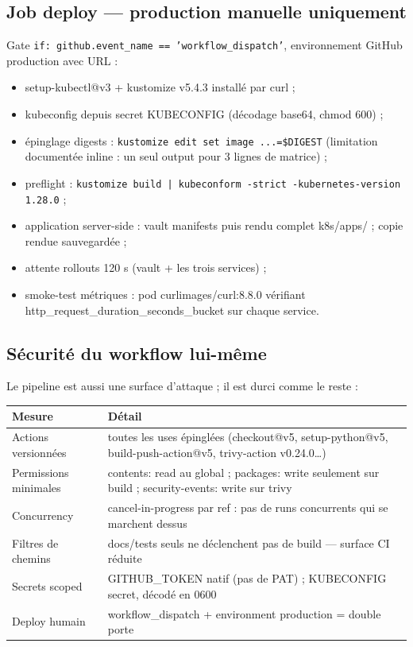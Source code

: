 \documentclass[12pt,a4paper]{article}
\begin{document}
\subsection{Job deploy --- production manuelle uniquement}
Gate \texttt{if: github.event\_name == 'workflow\_dispatch'}, environnement GitHub production avec URL :
\begin{itemize}[itemsep=1pt]
  \item setup-kubectl@v3 + kustomize v5.4.3 installé par curl ;
  \item kubeconfig depuis secret KUBECONFIG (décodage base64, chmod 600) ;
  \item épinglage digests : \texttt{kustomize edit set image ...=\$DIGEST} (limitation documentée inline : un seul output pour 3 lignes de matrice) ;
  \item preflight : \texttt{kustomize build | kubeconform -strict -kubernetes-version 1.28.0} ;
  \item application server-side : vault manifests puis rendu complet k8s/apps/ ; copie rendue sauvegardée ;
  \item attente rollouts 120 s (vault + les trois services) ;
  \item smoke-test métriques : pod curlimages/curl:8.8.0 vérifiant http\_request\_duration\_seconds\_bucket sur chaque service.
\end{itemize}

\subsection{Sécurité du workflow lui-même}
Le pipeline est aussi une surface d'attaque ; il est durci comme le reste :

\begin{longtable}{@{}p{4.6cm}p{9.6cm}@{}}
\toprule
\textbf{Mesure} & \textbf{Détail} \\
\midrule
\endhead
Actions versionnées & toutes les uses épinglées (checkout@v5, setup-python@v5, build-push-action@v5, trivy-action v0.24.0\ldots) \\
Permissions minimales & contents: read au global ; packages: write seulement sur build ; security-events: write sur trivy \\
Concurrency & cancel-in-progress par ref : pas de runs concurrents qui se marchent dessus \\
Filtres de chemins & docs/tests seuls ne déclenchent pas de build --- surface CI réduite \\
Secrets scoped & GITHUB\_TOKEN natif (pas de PAT) ; KUBECONFIG secret, décodé en 0600 \\
Deploy humain & workflow\_dispatch + environment production = double porte \\
\bottomrule
\end{longtable}
\end{document}
